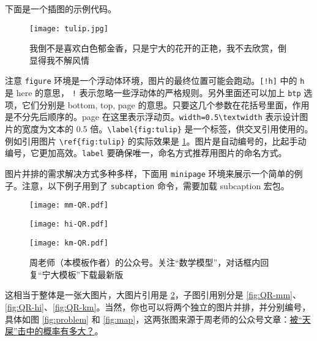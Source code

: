 下面是一个插图的示例代码。
\begin{figure}[!htb]
  \centering
  \texttt{[image: tulip.jpg]}
  \caption{我倒不是喜欢白色郁金香，只是宁大的花开的正艳，我不去欣赏，倒显得我不解风情}
  \label{fig:tulip}
\end{figure}
注意 \verb|figure| 环境是一个浮动体环境，图片的最终位置可能会跑动。\verb|[!h]| 中的 \verb|h| 是 here 的意思， \verb|!| 表示忽略一些浮动体的严格规则。另外里面还可以加上 \verb|btp| 选项，它们分别是 bottom, top, page 的意思。只要这几个参数在花括号里面，作用是不分先后顺序的。page 在这里表示浮动页。\verb|width=0.5\textwidth| 表示设计图片的宽度为文本的 0.5 倍。\verb|\label{fig:tulip}| 是一个标签，供交叉引用使用的。例如引用图片 \verb|\ref{fig:tulip}| 的实际效果是 \ref{fig:tulip}。图片是自动编号的，比起手动编号，它更加高效。\verb|label| 要确保唯一，命名方式推荐用图片的命名方式。

图片并排的需求解决方式多种多样，下面用 \verb|minipage| 环境来展示一个简单的例子。注意，以下例子用到了 \verb|subcaption| 命令，需要加载 subcaption 宏包。
\begin{figure}[!htb]
    \centering
    \begin{minipage}[c]{0.32\textwidth}
        \centering
        \texttt{[image: mm-QR.pdf]}
        \label{fig:QR-mm}
    \end{minipage}
    \begin{minipage}[c]{0.32\textwidth}
        \centering
        \texttt{[image: hi-QR.pdf]}
        \label{fig:QR-hi}
    \end{minipage}
    \begin{minipage}[c]{0.32\textwidth}
        \centering
        \texttt{[image: km-QR.pdf]}
        \label{fig:QR-km}
    \end{minipage}
    \caption{周老师（本模板作者）的公众号。关注“数学模型”，对话框内回复“宁大模板”下载最新版}
    \label{fig:QR}
\end{figure}
这相当于整体是一张大图片，大图片引用是 \ref{fig:QR}，子图引用别分是 \ref{fig:QR-mm}、\ref{fig:QR-hi}、\ref{fig:QR-km}。当然，你也可以将两个独立的图片并排，并分别编号，具体如图 \ref{fig:problem} 和 \ref{fig:map}，这两张图来源于周老师的公众号文章：\href{https://mp.weixin.qq.com/s/uI-NiR-1rdzeKxjOOUzqlw}{被“天屎”击中的概率有多大？}\cite{nbubirds}。

